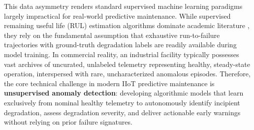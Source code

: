 \documentclass[12pt,a4paper,oneside]{report}
\begin{document}
This data asymmetry renders standard supervised machine learning paradigms largely impractical for real-world predictive maintenance. While supervised remaining useful life (RUL) estimation algorithms dominate academic literature \cite{babu2016deep, zheng2017long, li2018remaining}, they rely on the fundamental assumption that exhaustive run-to-failure trajectories with ground-truth degradation labels are readily available during model training. In commercial reality, an industrial facility typically possesses vast archives of uncurated, unlabeled telemetry representing healthy, steady-state operation, interspersed with rare, uncharacterized anomalous episodes. Therefore, the core technical challenge in modern IIoT predictive maintenance is \textbf{unsupervised anomaly detection}: developing algorithmic models that learn exclusively from nominal healthy telemetry to autonomously identify incipient degradation, assess degradation severity, and deliver actionable early warnings without relying on prior failure signatures.
\end{document}
